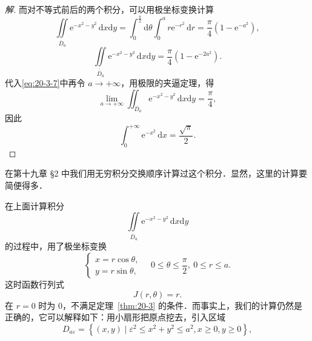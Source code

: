 \begin{proof}[解]
而对不等式前后的两个积分，可以用极坐标变换计算
\[
\iint\limits_{\overline{D}_{a}}\mathrm{e}^{-x^{2}-y^{2}}\,\mathrm{d}x\mathrm{d}y=\int_{0}^{\frac{\pi}{2}}\mathrm{d}\theta\int_{0}^{a}r\mathrm{e}^{-r^{2}}\,\mathrm{d}r=\frac{\pi}{4}(1-\mathrm{e}^{-a^{2}}),
\]
\[
\iint\limits_{\overline{\overline{D}}_{a}}\mathrm{e}^{-x^{2}-y^{2}}\,\mathrm{d}x\mathrm{d}y=\frac{\pi}{4}(1-\mathrm{e}^{-2a^{2}}).
\]
代入\eqref{eq:20-3-7}中再令 $a\to+\infty$，用极限的夹逼定理，得
\[
\lim_{a\to+\infty}\iint_{D_{a}}\mathrm{e}^{-x^{2}-y^{2}}\,\mathrm{d}x\mathrm{d}y=\frac{\pi}{4},
\]
因此
\[
\int_{0}^{+\infty}\mathrm{e}^{-x^{2}}\,\mathrm{d}x=\frac{\sqrt{\pi}}{2}.
\]
\end{proof}

在第十九章 §2 中我们用无穷积分交换顺序计算过这个积分．显然，这里的计算要简便得多．

在上面计算积分
\[
\iint\limits_{\overline{D}_{a}}\mathrm{e}^{-x^{2}-y^{2}}\,\mathrm{d}x\mathrm{d}y
\]
的过程中，用了极坐标变换
\[
\begin{cases}
x=r\cos\theta,\\
y=r\sin\theta,
\end{cases}
\quad 0\leqslant\theta\leqslant\frac{\pi}{2},\ 0\leqslant r\leqslant a.
\]
这时函数行列式
\[
J(r,\theta)=r.
\]
在 $r=0$ 时为 $0$，不满足定理~\ref{thm:20-3} 的条件．而事实上，我们的计算仍然是正确的，它可以解释如下：用小扇形把原点挖去，引入区域
\[
D_{a\varepsilon}=\left\{(x,y)\mid\varepsilon^{2}\leqslant x^{2}+y^{2}\leqslant a^{2},x\geqslant 0,y\geqslant 0\right\},
\]

\begin{figure}[htbp]
\centering
{}\caption{\relax}\label{fig:20-28}
\end{figure}

